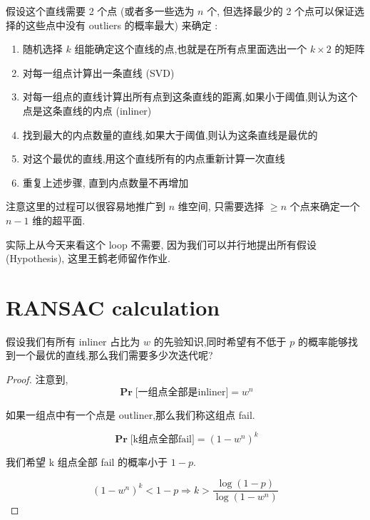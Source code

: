 \begin{definition}
    假设这个直线需要 2 个点 (或者多一些选为 $n$ 个, 但选择最少的 2 个点可以保证选择的这些点中没有 outliers 的概率最大) 来确定 : 

    \begin{enumerate}
        \item 随机选择 $k$ 组能确定这个直线的点,也就是在所有点里面选出一个 $k\times 2$ 的矩阵
        \item 对每一组点计算出一条直线 (SVD)
        \item 对每一组点的直线计算出所有点到这条直线的距离,如果小于阈值,则认为这个点是这条直线的内点 (inliner)
        \item 找到最大的内点数量的直线,如果大于阈值,则认为这条直线是最优的
        \item 对这个最优的直线,用这个直线所有的内点重新计算一次直线
        \item 重复上述步骤, 直到内点数量不再增加
    \end{enumerate}
    
    注意这里的过程可以很容易地推广到 $n$ 维空间, 只需要选择 $\geq n$ 个点来确定一个 $n-1$ 维的超平面.
\end{definition}
\begin{note}
    实际上从今天来看这个 loop 不需要, 因为我们可以并行地提出所有假设 (Hypothesis), 这里王鹤老师留作作业.
\end{note}

\section{RANSAC calculation}
\begin{problem}
假设我们有所有 inliner 占比为 $w$ 的先验知识,同时希望有不低于 $p$ 的概率能够找到一个最优的直线,那么我们需要多少次迭代呢?
\end{problem}
\begin{proof}
注意到, 
\begin{equation}
\mathbf{\Pr}\text{[一组点全部是inliner]} = w^n
\end{equation}

如果一组点中有一个点是 outliner,那么我们称这组点 fail.

\begin{equation}
\mathbf{\Pr}\text{[k组点全部fail]} = {(1-w^n)}^k
\end{equation}

我们希望 k 组点全部 fail 的概率小于 $1-p$.

\begin{equation}
{(1-w^{n})}^k < 1-p
\Rightarrow
k > \frac{\log(1-p)}{\log(1-w^n)}
\end{equation}
\end{proof}

